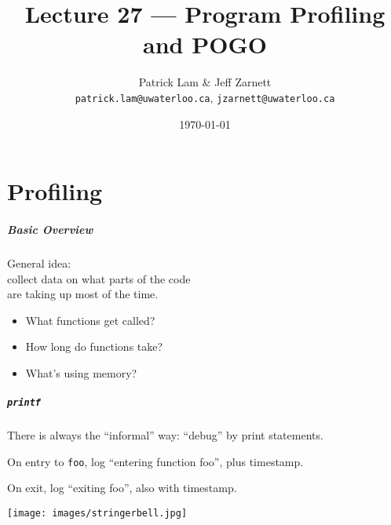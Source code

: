 

\title{Lecture 27 --- Program Profiling and POGO }

\author{Patrick Lam \& Jeff Zarnett \\ \small \texttt{patrick.lam@uwaterloo.ca}, \texttt{jzarnett@uwaterloo.ca}}
\date{\today}




\begin{frame}
  \titlepage

 \end{frame}



\part{Profiling}

\begin{frame}
\partpage
\end{frame}





\begin{frame}
\frametitle{Basic Overview}


\begin{changemargin}{1.5cm}
General idea:\\
\qquad collect data on what parts of the code\\
\qquad are taking up most of the time.

\begin{itemize}
\item What functions get called?
\item How long do functions take?
\item What's using memory?
\end{itemize}
\end{changemargin}

\end{frame}



\begin{frame}
\frametitle{\texttt{printf}}


\begin{changemargin}{1.5cm}
There is always the ``informal'' way: ``debug'' by print statements.

On entry to \texttt{foo}, log ``entering function foo'', plus timestamp.

On exit, log ``exiting foo'', also with timestamp.
\end{changemargin}

\begin{center}
	\texttt{[image: images/stringerbell.jpg]}
\end{center}

\end{frame}



